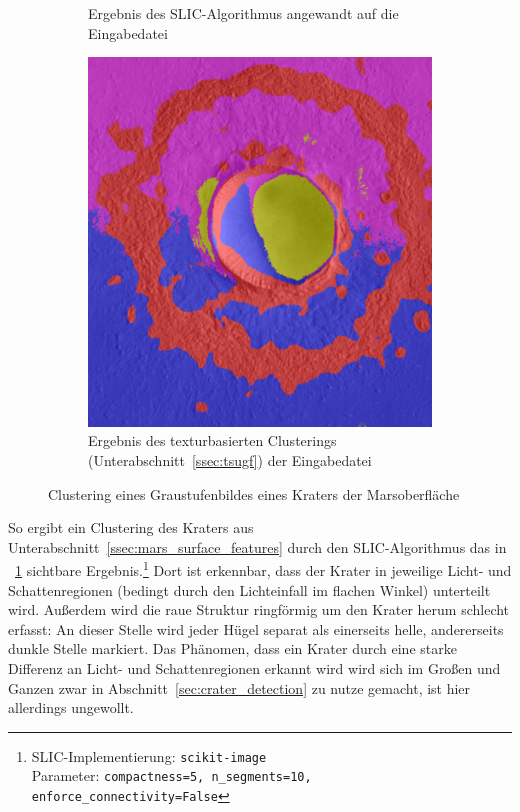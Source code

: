 \begin{figure}[h!]
\begin{subfigure}[t]{0.32\textwidth}
		\captionsetup{format=plain,width=0.85\textwidth}
		\caption{Ergebnis des SLIC-Algorithmus \cite{achanta_10} angewandt auf die Eingabedatei}
		\label{fig:slic_vs_tsugf_slic}
	\end{subfigure}
	\hfill
	\begin{subfigure}[t]{0.32\textwidth}
		\centering
		\includegraphics[width=\textwidth,keepaspectratio]{images/gen/slic_vs_tsugf/Gre13_01.jpg_tsugf.png}
		\captionsetup{format=plain,width=0.85\textwidth}
		\caption{Ergebnis des texturbasierten Clusterings (\vgl Unterabschnitt~\ref{ssec:tsugf}) der Eingabedatei}
		\label{fig:slic_vs_tsugf_tsugf}
	\end{subfigure}
	\caption{Clustering eines Graustufenbildes eines Kraters der Marsoberfläche}
\end{figure}

So ergibt ein Clustering des Kraters aus Unterabschnitt~\ref{ssec:mars_surface_features} durch den SLIC-Algorithmus \cite{achanta_10} das in \figurename~\ref{fig:slic_vs_tsugf_slic} sichtbare Ergebnis.\footnote{SLIC-Implementierung: \texttt{scikit-image}\\Parameter: \texttt{compactness=5, n\_segments=10, enforce\_connectivity=False}} Dort ist erkennbar, dass der Krater in jeweilige Licht- und Schattenregionen (bedingt durch den Lichteinfall im flachen Winkel) unterteilt wird. Außerdem wird die raue Struktur ringförmig um den Krater herum schlecht erfasst: An dieser Stelle wird jeder Hügel separat als einerseits helle, andererseits dunkle Stelle markiert. Das Phänomen, dass ein Krater durch eine starke Differenz an Licht- und Schattenregionen erkannt wird wird sich im Großen und Ganzen zwar in Abschnitt~\ref{sec:crater_detection} zu nutze gemacht, ist hier allerdings ungewollt.

